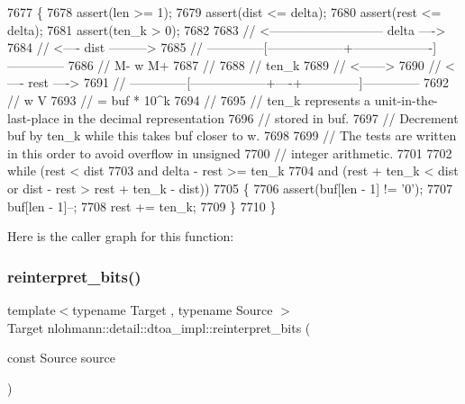 \begin{DoxyCode}
7677 \{
7678     assert(len >= 1);
7679     assert(dist <= delta);
7680     assert(rest <= delta);
7681     assert(ten\_k > 0);
7682 
7683     \textcolor{comment}{//               <--------------------------- delta ---->}
7684     \textcolor{comment}{//                                  <---- dist --------->}
7685     \textcolor{comment}{// --------------[------------------+-------------------]--------------}
7686     \textcolor{comment}{//               M-                 w                   M+}
7687     \textcolor{comment}{//}
7688     \textcolor{comment}{//                                  ten\_k}
7689     \textcolor{comment}{//                                <------>}
7690     \textcolor{comment}{//                                       <---- rest ---->}
7691     \textcolor{comment}{// --------------[------------------+----+--------------]--------------}
7692     \textcolor{comment}{//                                  w    V}
7693     \textcolor{comment}{//                                       = buf * 10^k}
7694     \textcolor{comment}{//}
7695     \textcolor{comment}{// ten\_k represents a unit-in-the-last-place in the decimal representation}
7696     \textcolor{comment}{// stored in buf.}
7697     \textcolor{comment}{// Decrement buf by ten\_k while this takes buf closer to w.}
7698 
7699     \textcolor{comment}{// The tests are written in this order to avoid overflow in unsigned}
7700     \textcolor{comment}{// integer arithmetic.}
7701 
7702     \textcolor{keywordflow}{while} (rest < dist
7703             and delta - rest >= ten\_k
7704             and (rest + ten\_k < dist or dist - rest > rest + ten\_k - dist))
7705     \{
7706         assert(buf[len - 1] != \textcolor{charliteral}{'0'});
7707         buf[len - 1]--;
7708         rest += ten\_k;
7709     \}
7710 \}
\end{DoxyCode}
Here is the caller graph for this function\+:
\mbox{\label{namespacenlohmann_1_1detail_1_1dtoa__impl_a1c5d30eb51e5e994a3f48bde104d2ce8}} 
\subsubsection{\texorpdfstring{reinterpret\+\_\+bits()}{reinterpret\_bits()}}
{\footnotesize\ttfamily template$<$typename Target , typename Source $>$ \\
Target nlohmann\+::detail\+::dtoa\+\_\+impl\+::reinterpret\+\_\+bits (\begin{DoxyParamCaption}\item[{const Source}]{source }\end{DoxyParamCaption})}



